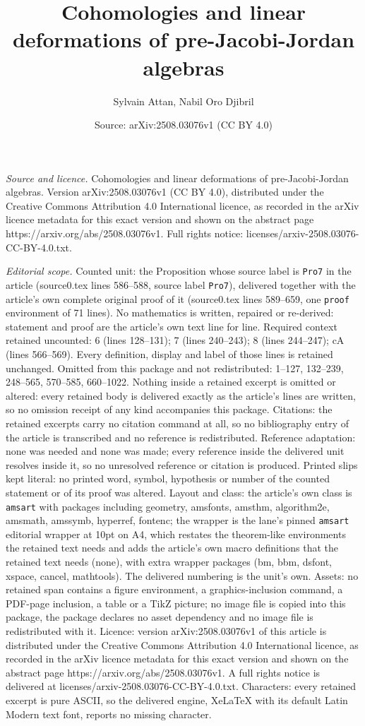 \documentclass[10pt,a4paper]{amsart}
\title[Cohomologies and linear deformations of pre-Jacobi-Jordan al]{Cohomologies and linear deformations of pre-Jacobi-Jordan algebras}
\author{Sylvain Attan, Nabil Oro Djibril}
\date{Source: arXiv:2508.03076v1 (CC BY 4.0)}
\begin{document}
\maketitle

\noindent\emph{Source and licence.} Cohomologies and linear deformations of pre-Jacobi-Jordan algebras. Version arXiv:2508.03076v1 (CC BY 4.0), distributed under the Creative Commons Attribution 4.0 International licence, as recorded in the arXiv licence metadata for this exact version and shown on the abstract page https://arxiv.org/abs/2508.03076v1. Full rights notice: licenses/arxiv-2508.03076-CC-BY-4.0.txt.\par\smallskip

\noindent\textit{Editorial scope.} Counted unit: the Proposition whose source label is \texttt{Pro7} in the article (source0.tex lines 586--588, source label \texttt{Pro7}), delivered together with the article's own complete original proof of it (source0.tex lines 589--659, one \texttt{proof} environment of 71 lines). No mathematics is written, repaired or re-derived: statement and proof are the article's own text line for line. Required context retained uncounted: 6 (lines 128--131); 7 (lines 240--243); 8 (lines 244--247); cA (lines 566--569). Every definition, display and label of those lines is retained unchanged. Omitted from this package and not redistributed: 1--127, 132--239, 248--565, 570--585, 660--1022. Nothing inside a retained excerpt is omitted or altered: every retained body is delivered exactly as the article's lines are written, so no omission receipt of any kind accompanies this package. Citations: the retained excerpts carry no citation command at all, so no bibliography entry of the article is transcribed and no reference is redistributed. Reference adaptation: none was needed and none was made; every reference inside the delivered unit resolves inside it, so no unresolved reference or citation is produced. Printed slips kept literal: no printed word, symbol, hypothesis or number of the counted statement or of its proof was altered. Layout and class: the article's own class is \texttt{amsart} with packages including geometry, amsfonts, amsthm, algorithm2e, amsmath, amssymb, hyperref, fontenc; the wrapper is the lane's pinned \texttt{amsart} editorial wrapper at 10pt on A4, which restates the theorem-like environments the retained text needs and adds the article's own macro definitions that the retained text needs (none), with extra wrapper packages (bm, bbm, dsfont, xspace, cancel, mathtools). The delivered numbering is the unit's own. Assets: no retained span contains a figure environment, a graphics-inclusion command, a PDF-page inclusion, a table or a TikZ picture; no image file is copied into this package, the package declares no asset dependency and no image file is redistributed with it. Licence: version arXiv:2508.03076v1 of this article is distributed under the Creative Commons Attribution 4.0 International licence, as recorded in the arXiv licence metadata for this exact version and shown on the abstract page https://arxiv.org/abs/2508.03076v1. A full rights notice is delivered at licenses/arxiv-2508.03076-CC-BY-4.0.txt. Characters: every retained excerpt is pure ASCII, so the delivered engine, XeLaTeX with its default Latin Modern text font, reports no missing character.
\end{document}
